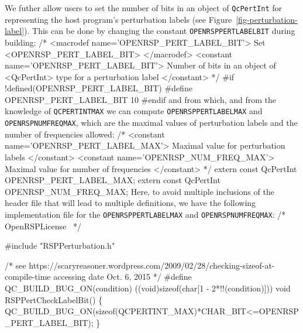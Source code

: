 We futher allow users to set the number of bits in an object of {\tt{}QcPertInt}
for representing the host program's perturbation labels (see
Figure~\ref{fig-perturbation-label}). This can be done by changing the constant
{\tt{}OPENRSP{}PERT{}LABEL{}BIT} during building:
\nwenddocs{}\plusendmoddef
/* <macrodef name='OPENRSP_PERT_LABEL_BIT'>
     Set <OPENRSP_PERT_LABEL_BIT>
   </macrodef>
   <constant name='OPENRSP_PERT_LABEL_BIT'>
     Number of bits in an object of <QcPertInt> type for a perturbation label
   </constant> */
#if !defined(OPENRSP_PERT_LABEL_BIT)
#define OPENRSP_PERT_LABEL_BIT 10
#endif
\nwendcode{}and from which, and from the knowledge of {\tt{}QCPERTINT{}MAX} we can compute
{\tt{}OPENRSP{}PERT{}LABEL{}MAX} and
{\tt{}OPENRSP{}NUM{}FREQ{}MAX}, which are the maximal
values of perturbation labels and the number of frequencies allowed:
\nwenddocs{}\plusendmoddef
/* <constant name='OPENRSP_PERT_LABEL_MAX'>
     Maximal value for perturbation labels
   </constant>
   <constant name='OPENRSP_NUM_FREQ_MAX'>
     Maximal value for number of frequencies
   </constant> */
extern const QcPertInt OPENRSP_PERT_LABEL_MAX;
extern const QcPertInt OPENRSP_NUM_FREQ_MAX;
\nwendcode{}Here, to avoid multiple inclusions of the header file that will lead to
multiple definitions, we have the following implementation file for the
{\tt{}OPENRSP{}PERT{}LABEL{}MAX} and {\tt{}OPENRSP{}NUM{}FREQ{}MAX}:
\nwenddocs{}\endmoddef
/*
  \LA{}OpenRSPLicense~{\nwtagstyle{}}\RA{}
*/

#include "RSPPerturbation.h"

/* see https://scaryreasoner.wordpress.com/2009/02/28/checking-sizeof-at-compile-time
   accessing date Oct. 6, 2015 */
#define QC_BUILD_BUG_ON(condition) ((void)sizeof(char[1 - 2*!!(condition)]))
void RSPPertCheckLabelBit()
\{
    QC_BUILD_BUG_ON(sizeof(QCPERTINT_MAX)*CHAR_BIT<=OPENRSP_PERT_LABEL_BIT);
\}

